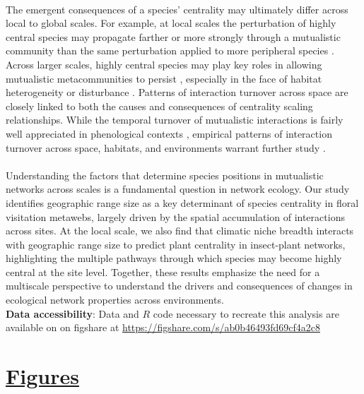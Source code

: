 \paragraph*{}
The emergent consequences of a species' centrality may ultimately differ across local to global scales. For example, at local scales the perturbation of highly central species may propagate farther or more strongly through a mutualistic community than the same perturbation applied to more peripheral species \parencite{Cauga2019, delmas2019, martins2024propagation}. Across larger scales, highly central species may play key roles in allowing mutualistic metacommunities to persist \parencite{filotas2010effect}, especially in the face of habitat heterogeneity or disturbance \parencite{prakash2004habitat}. Patterns of interaction turnover across space are closely linked to both the causes and consequences of centrality scaling relationships. While the temporal turnover of mutualistic interactions is fairly well appreciated in phenological contexts \parencite{olesen2008temporal, chavez2020drivers}, empirical patterns of interaction turnover across space, habitats, and environments warrant further study \parencite{tylianakis2017}. 


\paragraph*{}
Understanding the factors that determine species positions in mutualistic networks across scales is a fundamental question in network ecology. Our study identifies geographic range size as a key determinant of species centrality in floral visitation metawebs, largely driven by the spatial accumulation of interactions across sites. At the local scale, we also find that climatic niche breadth interacts with geographic range size to predict plant centrality in insect-plant networks, highlighting the multiple pathways through which species may become highly central at the site level. Together, these results emphasize the need for a multiscale perspective to understand the drivers and consequences of changes in ecological network properties across environments. 
\\

\noindent \textbf{Data accessibility}: Data and $R$ code necessary to recreate this analysis are available on on figshare at \url{https://figshare.com/s/ab0b46493fd69cf4a2c8}\\

\section*{\textbf{\underline{Figures}}}

